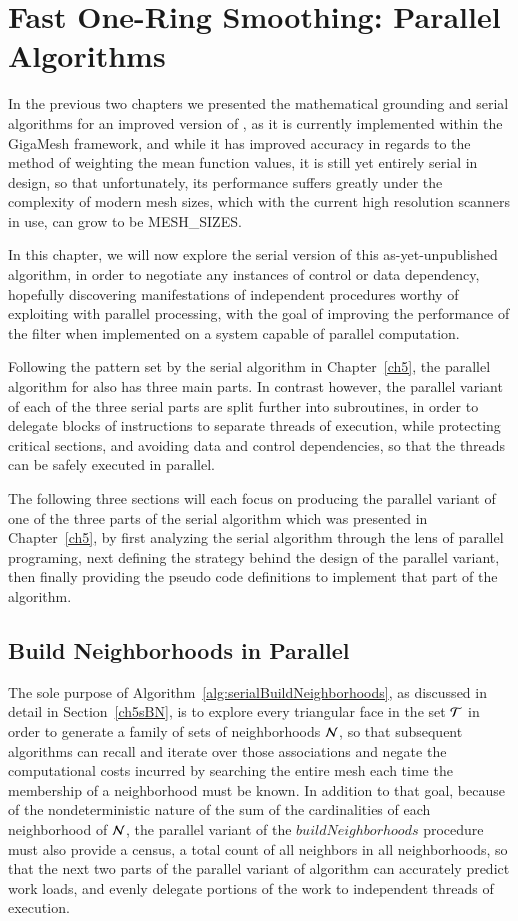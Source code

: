 \chapter{Fast One-Ring Smoothing: Parallel Algorithms}
\label{ch6}
In the previous two chapters we presented the mathematical grounding and serial algorithms for an improved version of , as it is currently implemented within the GigaMesh framework, and while it has improved accuracy in regards to the method of weighting the mean function values, it is still yet entirely serial in design, so that unfortunately, its performance suffers greatly under the complexity of modern mesh sizes, which with the current high resolution scanners in use, can grow to be MESH\_SIZES.

In this chapter, we will now explore the serial version of this as-yet-unpublished algorithm, in order to negotiate any instances of control or data dependency, hopefully discovering manifestations of independent procedures worthy of exploiting with parallel processing, with the goal of improving the performance of the filter when implemented on a system capable of parallel computation.

Following the pattern set by the serial algorithm in Chapter~\ref{ch5}, the parallel algorithm for  also has three main parts. In contrast however, the parallel variant of each of the three serial parts are split further into subroutines, in order to delegate blocks of instructions to separate threads of execution, while protecting critical sections, and avoiding data and control dependencies, so that the threads can be safely executed in parallel.

The following three sections will each focus on producing the parallel variant of one of the three parts of the serial algorithm which was presented in Chapter~\ref{ch5}, by first analyzing the serial algorithm through the lens of parallel programing, next defining the strategy behind the design of the parallel variant, then finally providing the pseudo code definitions to implement that part of the algorithm.

%
%
%
%
\section{Build Neighborhoods in Parallel}
\label{ch6sBNP}
The sole purpose of Algorithm~\ref{alg:serialBuildNeighborhoods}, as discussed in detail in Section~\ref{ch5sBN}, is to explore every triangular face in the set $\mathcal{T}$ in order to generate a family of sets of neighborhoods $\mathcal{N}$, so that subsequent algorithms can recall and iterate over those associations and negate the computational costs incurred by searching the entire mesh each time the membership of a neighborhood must be known. In addition to that goal, because of the nondeterministic nature of the sum of the cardinalities of each neighborhood of $\mathcal{N}$, the parallel variant of the $\mathit{buildNeighborhoods}$ procedure must also provide a census, a total count of all neighbors in all neighborhoods, so that the next two parts of the parallel variant of  algorithm can accurately predict work loads, and evenly delegate portions of the work to independent threads of execution.

